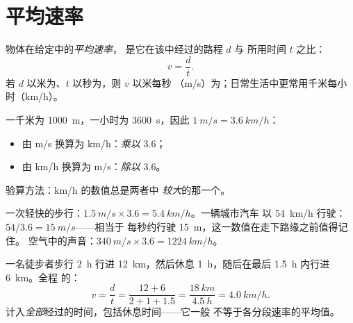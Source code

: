 \section{平均速率}

\begin{definition}[平均速率]\label{def:g10:relative-motion:speed}
物体在给定中的\emph{平均速率}，
是它在该中经过的路程 $d$ 与
所用时间 $t$ 之比：
\[
v = \frac{d}{t} .
\]
若 $d$ 以米为、$t$ 以秒为，则 $v$ 以米每秒
（\unit{m/s}）为；日常生活中更常用千米每小时（\unit{km/h}）。
\end{definition}

\begin{method}[米每秒与千米每小时之间的换算]\label{met:g10:relative-motion:convert}
一千米为 \qty{1000}{m}，一小时为 \qty{3600}{s}，因此
$\qty{1}{m/s} = \qty{3.6}{km/h}$：
\begin{itemize}
  \item 由 \unit{m/s} 换算为 \unit{km/h}：\emph{乘以} $3.6$；
  \item 由 \unit{km/h} 换算为 \unit{m/s}：\emph{除以} $3.6$。
\end{itemize}
验算方法：\unit{km/h} 的数值总是两者中
\emph{较大}的那一个。
\end{method}

\begin{example}[几个值得了解的速率]\label{ex:g10:relative-motion:convert}
一次轻快的步行：$\qty{1.5}{m/s} \times 3.6 = \qty{5.4}{km/h}$。一辆城市汽车
以 \qty{54}{km/h} 行驶：$54 / 3.6 = \qty{15}{m/s}$——相当于
每秒约行驶 \qty{15}{m}，这一数值在走下路缘之前值得记住。
空气中的声音：$\qty{340}{m/s} \times 3.6 = \qty{1224}{km/h}$。
\end{example}

\begin{example}[中途休息的徒步]\label{ex:g10:relative-motion:hike}
一名徒步者步行 \qty{2}{h} 行进 \qty{12}{km}，然后休息
\qty{1}{h}，随后在最后 \qty{1.5}{h} 内行进 \qty{6}{km}。全程
的：
\[
v = \frac{d}{t} = \frac{12 + 6}{2 + 1 + 1.5}
= \frac{\qty{18}{km}}{\qty{4.5}{h}} = \qty{4.0}{km/h}.
\]
计入\emph{全部}经过的时间，包括休息时间——它一般
不等于各分段速率的平均值。
\end{example}

